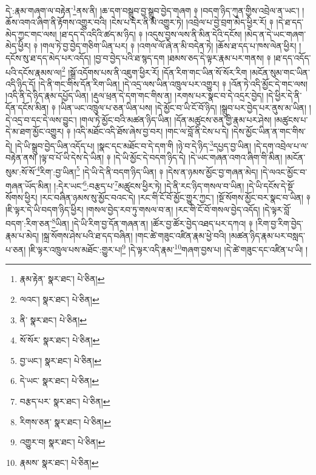 དེ་:རྣམ་གཞག་ལ་བརྟེན་\footnote{རྣམ་རྟེན་  སྣར་ཐང་།  པེ་ཅིན། }ནས་ནི། །ཆ་དག་བསྒྲུབ་བྱ་སྒྲུབ་བྱེད་གཞག ༈ །བདག་ཉིད་ཀུན་གྱིས་འབྲེལ་ན་ཡང་། །ཆོས་འགའ་ཞིག་ནི་རྟོགས་འགྱུར་བའི། །ངེས་པ་དེར་ནི་མི་འགྱུར་ཏེ། །འབྲེལ་པ་བྱེ་བྲག་མེད་ཕྱིར་རོ། ༈ །དེ་ཐ་དད་མེད་ཀྱང་གང་ལས། །ཐ་དད་དེ་འདིའི་ཚད་མ་ཉིད། ༈ །འདུས་བྱས་ལས་ནི་མིན་དེའི་དངོས། །མེད་ན་དེ་ཡང་གཞག་མེད་ཕྱིར། ༈ །གལ་ཏེ་བྱ་བྱེད་གཅིག་ཡིན་པར། ༈ །འགལ་ལོ་ཞེ་ན་མི་བདེན་ཏེ། །ཆོས་ཐ་དད་པ་ཁས་ལེན་ཕྱིར། །དངོས་སུ་ཐ་དད་མེད་པར་འདོད། །བྱ་བ་བྱེད་པའི་ཐ་སྙད་དག །ཐམས་ཅད་དེ་ལྟར་རྣམ་པར་གནས། ༈ །ཐ་དད་འདོད་པའི་དངོས་རྣམས་ལ།\footnote{ལའང་།  སྣར་ཐང་།  པེ་ཅིན། } །སྒྲོ་འདོགས་པས་ནི་འཇུག་ཕྱིར་རོ། །དོན་རིག་གང་ཡིན་སོ་སོར་རིག །མངོན་སུམ་གང་ཡིན་འདི་ཉིད་དོ། །དེ་ནི་གང་གིས་དོན་རིག་ཡིན། །དེ་འདྲ་ལས་ཡིན་འཁྲུལ་པར་འགྱུར། ༈ །འོན་ཏེ་འདི་མྱོང་དེ་གང་ལས། །འདི་ནི་དེ་ཉིད་རྣམ་དཔྱོད་ཡིན། །རྡུལ་ཕྲན་དེ་དག་གང་གིས་ན། །རགས་པར་སྣང་བ་དེ་འདྲར་བྱེད། །དེ་ཕྱིར་དེ་ནི་དོན་དངོས་མིན། ༈ །ཡིན་ཡང་འཁྲུལ་པ་ཅན་ཡིན་པས། །དེ་མྱོང་བ་ཡི་ངོ་བོ་ཉིད། །སྒྲུབ་པར་བྱེད་པར་ནུས་མ་ཡིན། །དེ་འདྲ་བ་དང་དེ་ལས་བྱུང་། །གལ་ཏེ་མྱོང་བའི་མཚན་ཉིད་ཡིན། །དོན་མཚུངས་ཅན་གྱི་རྣམ་པར་ཤེས། །མཚུངས་པ་དེ་མ་ཐག་མྱོང་འགྱུར། ༈ །འདི་མཐོང་འདི་ཐོས་ཞེས་བྱ་བར། །གང་ལ་བློ་ནི་ངེས་པ་དེ། །དེས་མྱོང་ཡིན་ན་གང་གིས་དེ། །དེ་ཡི་སྒྲུབ་བྱེད་ཡིན་འདོད་པ། །སྣང་དང་མཐོང་བ་དེ་དག་གི །ཉེ་བ་དེ་ཉིད་\footnote{ནི་  སྣར་ཐང་།  པེ་ཅིན། }དཔྱད་བྱ་ཡིན། །དེ་དག་འབྲེལ་པ་ལ་བརྟེན་ནས། །ལྟ་བ་པོ་ཡི་དེས་དེ་ཡིན། ༈ །དེ་ཡི་མྱོང་དེ་བདག་ཉིད་དེ། །དེ་ཡང་གཞན་འགའ་ཞིག་གི་མིན། །མངོན་སུམ་:སོ་སོ་\footnote{སོ་སོར་  སྣར་ཐང་།  པེ་ཅིན། }རིག་:བྱ་ཡིན།\footnote{བྱ་ཡང་།  སྣར་ཐང་།  པེ་ཅིན། } །དེ་ཡི་དེ་ནི་བདག་ཉིད་ཡིན། ༈ །དེས་ན་ཉམས་མྱོང་བྱ་གཞན་མེད། །དེ་ལའང་མྱོང་བ་གཞན་ཡོད་མིན། །:དེར་ཡང་\footnote{དེ་ཡང་  སྣར་ཐང་།  པེ་ཅིན། }:བརྩད་པ་\footnote{བརྩད་པར་  སྣར་ཐང་།  པེ་ཅིན། }མཚུངས་ཕྱིར་ཏེ། །དེ་ནི་རང་ཉིད་གསལ་བ་ཡིན། །དེ་ཡི་དངོས་དེ་སྔོ་སོགས་ཕྱིར། །རང་བཞིན་ཉམས་སུ་མྱོང་བའང་དེ། །རང་གི་ངོ་བོ་མྱོང་གྱུར་ཀྱང་། །སྔོ་སོགས་མྱོང་བར་སྣང་བ་ཡིན། ༈ །ཇི་ལྟར་དེ་ཡི་བདག་ཉིད་ཕྱིར། །གསལ་བྱེད་རབ་ཏུ་གསལ་བ་ན། །རང་གི་ངོ་བོ་གསལ་བྱེད་འདོད། །དེ་ལྟར་བློ་བདག་:རིག་ཅན་\footnote{རིགས་ཅན་  སྣར་ཐང་།  པེ་ཅིན། }ཡིན། །དེ་ཡི་རིག་བྱ་དོན་གཞན་ན། །ཚོར་བྱ་ཚོར་བྱེད་འཐད་པར་དཀའ། ༈ །རིག་བྱ་རིག་བྱེད་རྣམ་པ་མེད། །སྐྲ་སོགས་ཤེས་པའི་ཐ་དད་བཞིན། །གང་ཚེ་གཟུང་འཛིན་རྣམ་ཕྱེ་བའི། །མཚན་ཉིད་རྣམ་པར་བསླད་པ་ཅན། །ཇི་ལྟར་འཁྲུལ་པས་མཐོང་:གྱུར་པ།\footnote{འགྱུར་བ།  སྣར་ཐང་།  པེ་ཅིན། } །དེ་ལྟར་འདི་རྣམ་\footnote{རྣམས་  སྣར་ཐང་།  པེ་ཅིན། }གཞག་བྱས་པ། །དེ་ཚེ་གཟུང་དང་འཛིན་པ་ཡི། །
